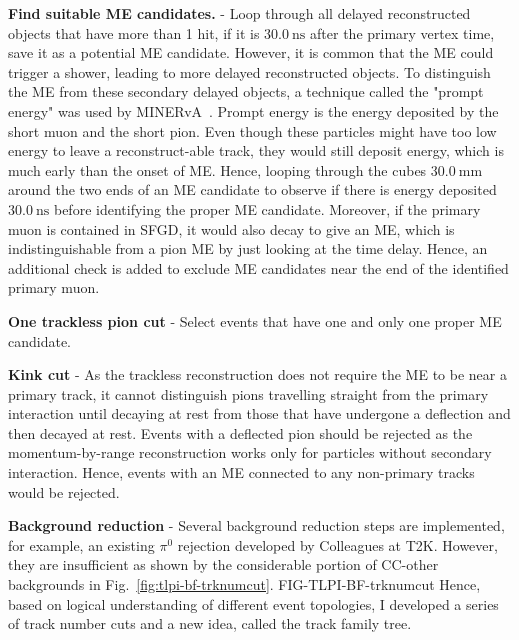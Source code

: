             \textbf{Find suitable ME candidates.} - Loop through all delayed reconstructed objects that have more than 1 hit, if it is $30.0~\textrm{ns}$ after the primary vertex time, save it as a potential ME candidate. 
            However, it is common that the ME could trigger a shower, leading to more delayed reconstructed objects. 
            To distinguish the ME from these secondary delayed objects, a technique called the "prompt energy" was used by MINERvA~\cite{Zhang2016}. 
            Prompt energy is the energy deposited by the short muon and the short pion. 
            Even though these particles might have too low energy to leave a reconstruct-able track, they would still deposit energy, which is much early than the onset of ME. 
            Hence, looping through the cubes $30.0~\textrm{mm}$ around the two ends of an ME candidate to observe if there is energy deposited $30.0~\textrm{ns}$ before identifying the proper ME candidate. 
            Moreover, if the primary muon is contained in SFGD, it would also decay to give an ME, which is indistinguishable from a pion ME by just looking at the time delay. 
            Hence, an additional check is added to exclude ME candidates near the end of the identified primary muon. 
        
            \textbf{One trackless pion cut} - Select events that have one and only one proper ME candidate.
        
            \textbf{Kink cut} - As the trackless reconstruction does not require the ME to be near a primary track, it cannot distinguish pions travelling straight from the primary interaction until decaying at rest from those that have undergone a deflection and then decayed at rest. 
            Events with a deflected pion should be rejected as the momentum-by-range reconstruction works only for particles without secondary interaction. 
            Hence, events with an ME connected to any non-primary tracks would be rejected.
        
            \textbf{Background reduction} - Several background reduction steps are implemented, for example, an existing $\pi^0$ rejection developed by Colleagues at T2K.
            However, they are insufficient as shown by the considerable portion of CC-other backgrounds in Fig.~\ref{fig:tlpi-bf-trknumcut}.
            FIG-TLPI-BF-trknumcut
            Hence, based on logical understanding of different event topologies, I developed a series of track number cuts and a new idea, called the track family tree.
            
